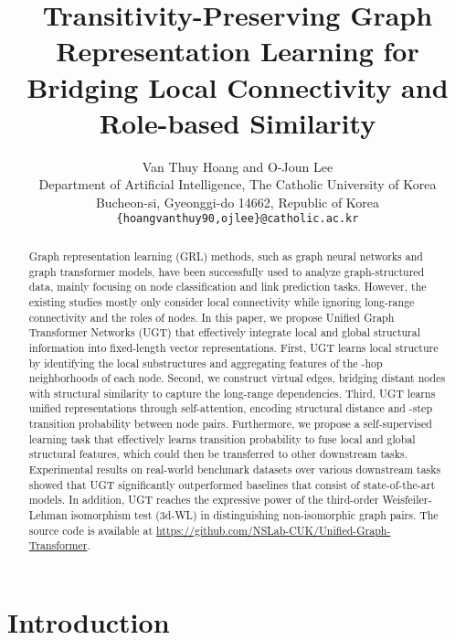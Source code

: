 \documentclass[oneside]{article}
\title{
Transitivity-Preserving Graph Representation Learning for Bridging Local Connectivity and Role-based Similarity }
\author{
  Van Thuy Hoang and O-Joun Lee \\
  Department of Artificial Intelligence, The Catholic University of Korea \\
  Bucheon-si, Gyeonggi-do 14662, Republic of Korea\\
  \texttt{\{hoangvanthuy90,ojlee\}@catholic.ac.kr} \\
  }
\begin{document}
\maketitle


\begin{abstract}

Graph representation learning (GRL) methods, such as graph neural networks and graph transformer models, have been successfully used to analyze graph-structured data, mainly focusing on node classification and link prediction tasks.
However, the existing studies mostly only consider local connectivity while ignoring long-range connectivity and the roles of nodes.
In this paper, we propose Unified Graph Transformer Networks (UGT) that effectively integrate local and global structural information into fixed-length vector representations.
First, UGT learns local structure by identifying the local substructures and aggregating features of the -hop neighborhoods of each node.
Second, we construct virtual edges, bridging distant nodes with structural similarity to capture the long-range dependencies.
Third, UGT learns unified representations through self-attention, encoding structural distance and -step transition probability between node pairs. 
Furthermore, we propose a self-supervised learning task that effectively learns transition probability to fuse local and global structural features, which could then be transferred to other downstream tasks. 
Experimental results on real-world benchmark datasets over various downstream tasks showed that UGT significantly outperformed baselines that consist of state-of-the-art models.
In addition, UGT reaches the expressive power of the third-order Weisfeiler-Lehman isomorphism test (3d-WL) in distinguishing non-isomorphic graph pairs.
The source code is available at \url{https://github.com/NSLab-CUK/Unified-Graph-Transformer}.

\let\thefootnote\relax
{} \end{abstract}






\section{Introduction}\label{sect:intro}
\end{document}

